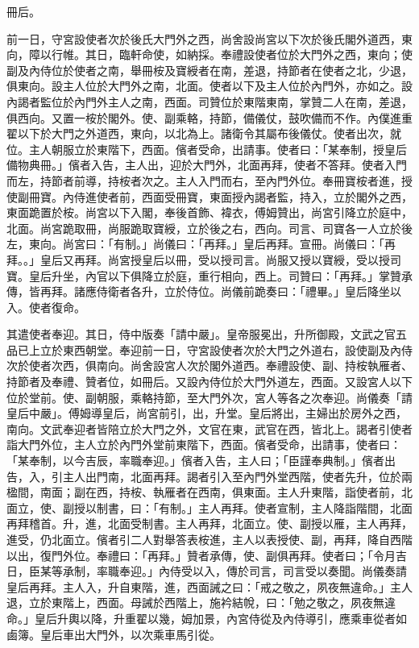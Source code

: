 \begin{pinyinscope}
 冊后。



 前一日，守宮設使者次於後氏大門外之西，尚舍設尚宮以下次於後氏閣外道西，東向，障以行帷。其日，臨軒命使，如納採。奉禮設使者位於大門外之西，東向；使副及內侍位於使者之南，舉冊桉及寶綬者在南，差退，持節者在使者之北，少退，俱東向。設主人位於大門外之南，北面。使者以下及主人位於內門外，亦如之。設內謁者監位於內門外主人之南，西面。司贊位於東階東南，掌贊二人在南，差退，俱西向。又置一桉於閣外。使、副乘輅，持節，備儀仗，鼓吹備而不作。內僕進重翟以下於大門之外道西，東向，以北為上。諸衛令其屬布後儀仗。使者出次，就位。主人朝服立於東階下，西面。儐者受命，出請事。使者曰：「某奉制，授皇后備物典冊。」儐者入告，主人出，迎於大門外，北面再拜，使者不答拜。使者入門而左，持節者前導，持桉者次之。主人入門而右，至內門外位。奉冊寶桉者進，授使副冊寶。內侍進使者前，西面受冊寶，東面授內謁者監，持入，立於閣外之西，東面跪置於桉。尚宮以下入閣，奉後首飾、褘衣，傅姆贊出，尚宮引降立於庭中，北面。尚宮跪取冊，尚服跪取寶綬，立於後之右，西向。司言、司寶各一人立於後左，東向。尚宮曰：「有制。」尚儀曰：「再拜。」皇后再拜。宣冊。尚儀曰：「再拜。。」皇后又再拜。尚宮授皇后以冊，受以授司言。尚服又授以寶綬，受以授司寶。皇后升坐，內官以下俱降立於庭，重行相向，西上。司贊曰：「再拜。」掌贊承傳，皆再拜。諸應侍衛者各升，立於侍位。尚儀前跪奏曰：「禮畢。」皇后降坐以入。使者復命。



 其遣使者奉迎。其日，侍中版奏「請中嚴」。皇帝服冕出，升所御殿，文武之官五品已上立於東西朝堂。奉迎前一日，守宮設使者次於大門之外道右，設使副及內侍次於使者次西，俱南向。尚舍設宮人次於閣外道西。奉禮設使、副、持桉執雁者、持節者及奉禮、贊者位，如冊后。又設內侍位於大門外道左，西面。又設宮人以下位於堂前。使、副朝服，乘輅持節，至大門外次，宮人等各之次奉迎。尚儀奏「請皇后中嚴」。傅姆導皇后，尚宮前引，出，升堂。皇后將出，主婦出於房外之西，南向。文武奉迎者皆陪立於大門之外，文官在東，武官在西，皆北上。謁者引使者詣大門外位，主人立於內門外堂前東階下，西面。儐者受命，出請事，使者曰：「某奉制，以今吉辰，率職奉迎。」儐者入告，主人曰；「臣謹奉典制。」儐者出告，入，引主人出門南，北面再拜。謁者引入至內門外堂西階，使者先升，位於兩楹間，南面；副在西，持桉、執雁者在西南，俱東面。主人升東階，詣使者前，北面立，使、副授以制書，曰：「有制。」主人再拜。使者宣制，主人降詣階間，北面再拜稽首。升，進，北面受制書。主人再拜，北面立。使、副授以雁，主人再拜，進受，仍北面立。儐者引二人對舉答表桉進，主人以表授使、副，再拜，降自西階以出，復門外位。奉禮曰：「再拜。」贊者承傳，使、副俱再拜。使者曰；「令月吉日，臣某等承制，率職奉迎。」內侍受以入，傳於司言，司言受以奏聞。尚儀奏請皇后再拜。主人入，升自東階，進，西面誡之曰：「戒之敬之，夙夜無違命。」主人退，立於東階上，西面。母誡於西階上，施衿結帨，曰：「勉之敬之，夙夜無違命。」皇后升輿以降，升重翟以幾，姆加景，內宮侍從及內侍導引，應乘車從者如鹵簿。皇后車出大門外，以次乘車馬引從。




\end{pinyinscope}
